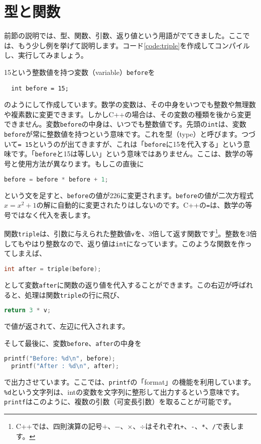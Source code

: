 \section{型と関数}
\label{sec:types}
前節の説明では、型、関数、引数、返り値という用語がでてきました。ここでは、もう少し例を挙げて説明します。コード\ref{code:triple}を作成してコンパイルし、実行してみましょう。

15という整数値を持つ変数（variable）\texttt{before}を
\begin{lstlisting}
  int before = 15; 
\end{lstlisting}
のようにして作成しています。数学の変数は、その中身をいつでも整数や無理数や複素数に変更できます。しかしC++の場合は、その変数の種類を後から変更できません。変数\texttt{before}の中身は、いつでも整数値です。先頭の\texttt{int}は、変数\texttt{before}が常に整数値を持つという意味です。これを型（type）と呼びます。つづいて\texttt{= 15}というのが出てきますが、これは「\texttt{before}に15を代入する」という意味です。「\texttt{before}と15は等しい」という意味ではありません。ここは、数学の等号と使用方法が異なります。もしこの直後に
\begin{lstlisting}[language=c++]
before = before * before + 1;
\end{lstlisting}
という文を足すと、\texttt{before}の値が226に変更されます。\texttt{before}の値が二次方程式$x=x^2+1$の解に自動的に変更されたりはしないのです。C++の\texttt{=}は、数学の等号ではなく代入を表します。

関数\texttt{triple}は、引数に与えられた整数値\texttt{v}を、3倍して返す関数です\footnote{C++では、四則演算の記号$+$、$-$、$\times$、$\div$はそれぞれ\texttt{+}、\texttt{-}、\texttt{*}、\texttt{/}で表します。}。整数を3倍してもやはり整数なので、返り値は\texttt{int}になっています。このような関数を作ってしまえば、
\begin{lstlisting}[language=c++]
  int after = triple(before);
\end{lstlisting}
として変数\texttt{after}に関数の返り値を代入することができます。この右辺が呼ばれると、処理は関数\texttt{triple}の行に飛び、
\begin{lstlisting}[language=c++]
  return 3 * v;
\end{lstlisting}
で値が返されて、左辺に代入されます。

そして最後に、変数\texttt{before}、\texttt{after}の中身を
\begin{lstlisting}[language=c++]
  printf("Before: %d\n", before); 
  printf("After : %d\n", after);
\end{lstlisting} 
で出力させています。ここでは、\texttt{printf}の「format」の機能を利用しています。\texttt{\%d}という文字列は、intの変数を文字列に整形して出力するという意味です。\texttt{printf}はこのように、複数の引数（可変長引数）を取ることが可能です。

